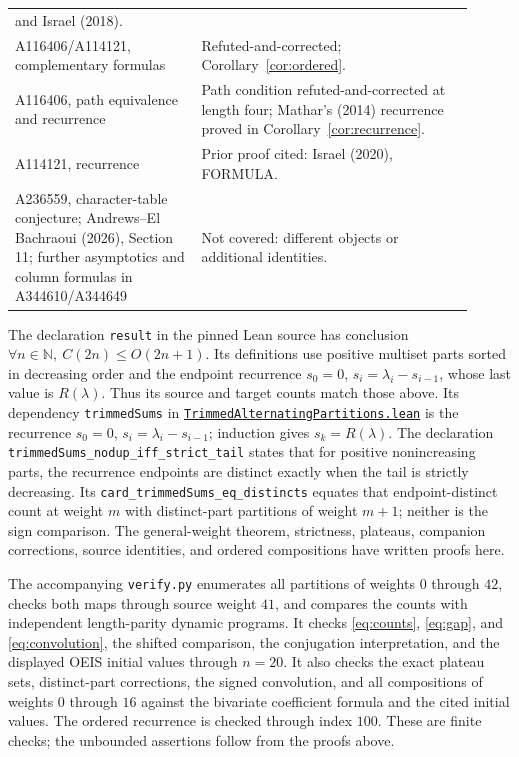 \documentclass[11pt]{article}
\newcommand{\NN}{\mathbb N}
\begin{document}
\begin{center}
\begin{tabular}{p{0.37\linewidth}p{0.54\linewidth}}
and Israel (2018). \\
A116406/A114121, complementary formulas & Refuted-and-corrected;
Corollary~\ref{cor:ordered}. \\
A116406, path equivalence and recurrence & Path condition
refuted-and-corrected at length four; Mathar's (2014) recurrence proved
in Corollary~\ref{cor:recurrence}. \\
A114121, recurrence & Prior proof cited: Israel (2020), FORMULA. \\
A236559, character-table conjecture;
Andrews--El Bachraoui (2026), Section 11; further asymptotics and
column formulas in A344610/A344649 & Not covered: different objects
or additional identities. \\
\bottomrule
\end{tabular}
\end{center}

The declaration \texttt{result} in the pinned Lean source \cite{lean}
has conclusion $\forall n\in\NN,\ C(2n)\le O(2n+1)$.
Its definitions use positive multiset parts sorted in decreasing order
and the endpoint recurrence $s_0=0$, $s_i=\lambda_i-s_{i-1}$,
whose last value is $R(\lambda)$. Thus its source and target counts
match those above. Its dependency \texttt{trimmedSums} in
\href{https://github.com/the-omega-institute/trureturing/blob/d133fcb1d5e4878bdf5232fd0c07ef2abb3da1d9/D5/S1/Words/Compositions/TrimmedAlternatingPartitions.lean}{\texttt{TrimmedAlternatingPartitions.lean}}
is the recurrence $s_0=0$, $s_i=\lambda_i-s_{i-1}$; induction gives
$s_k=R(\lambda)$. The declaration
\texttt{trimmedSums\_nodup\_iff\_strict\_tail} states that for positive
nonincreasing parts, the recurrence endpoints are distinct exactly
when the tail is strictly decreasing. Its
\texttt{card\_trimmedSums\_eq\_distincts} equates that endpoint-distinct
count at weight $m$ with distinct-part partitions of weight $m+1$;
neither is the sign comparison.
The general-weight theorem, strictness, plateaus, companion corrections,
source identities, and ordered compositions have written proofs here.

The accompanying \texttt{verify.py} enumerates all partitions of weights
$0$ through $42$, checks both maps through source weight $41$, and
compares the counts with independent length-parity dynamic programs.
It checks \eqref{eq:counts}, \eqref{eq:gap}, and
\eqref{eq:convolution}, the shifted comparison, the conjugation
interpretation, and the displayed OEIS initial values through $n=20$.
It also checks the exact plateau sets, distinct-part corrections,
the signed convolution, and all compositions of weights $0$ through
$16$ against the bivariate coefficient formula and the cited initial
values. The ordered recurrence is checked through index $100$.
These are finite checks; the unbounded assertions follow from the
proofs above.
\end{document}
